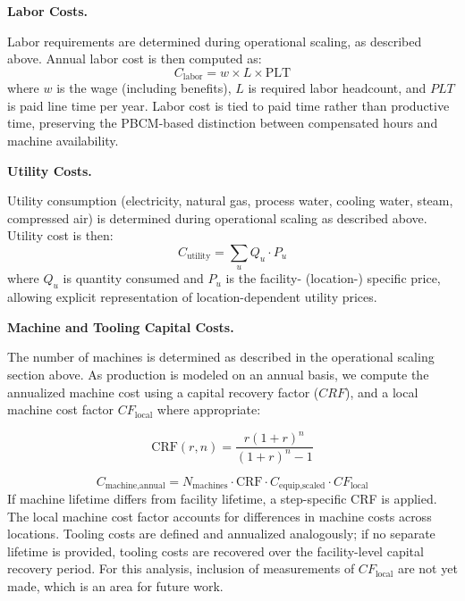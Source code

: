 \documentclass{article}
\renewcommand\_{\textunderscore\allowbreak}
\newcommand{\alteq}[1]{}
\newcommand{\alteqend}{}
\begin{document}
\medskip
\noindent\textbf{Labor Costs.}\quad

Labor requirements are determined during operational scaling, as described above. Annual labor cost is then computed as:
\begin{equation}
    C_{\text{labor}} = w \times L \times \text{PLT}
\end{equation}
where $w$ is the wage (including benefits), $L$ is required labor headcount, and $PLT$ is paid line time per year. Labor cost is tied to paid time rather than productive time, preserving the PBCM-based distinction between compensated hours and machine availability.

\medskip
\noindent\textbf{Utility Costs.}\quad

Utility consumption (electricity, natural gas, process water, cooling water, steam, compressed air) is determined during operational scaling as described above. Utility cost is then:
\begin{equation}
    C_{\text{utility}} = \sum_{u} Q_u \cdot P_u
\end{equation}
where $Q_u$ is quantity consumed and $P_u$ is the facility- (location-) specific price, allowing explicit representation of location-dependent utility prices.

\medskip
\noindent\textbf{Machine and Tooling Capital Costs.}\quad

The number of machines is determined as described in the operational scaling section above. As production is modeled on an annual basis, we compute the annualized machine cost using a capital recovery factor ($CRF$), and a local machine cost factor $CF_{\text{local}}$ where appropriate:
\alteq{Capital recovery factor CRF as a function of discount rate r and lifetime n equals r times the quantity one plus r raised to the n, divided by the quantity one plus r raised to the n minus one.}
\begin{equation}
    \text{CRF}(r, n) = \frac{r(1+r)^n}{(1+r)^n - 1}
    \label{eq:c-crf}
\end{equation}
\alteqend
\begin{equation}
    C_{\text{machine,annual}} = N_\text{{machines}} \cdot \text{CRF} \cdot C_{\text{equip,scaled}} \cdot CF_{\text{local}}
\end{equation}
If machine lifetime differs from facility lifetime, a step-specific CRF is applied. The local machine cost factor accounts for differences in machine costs across locations. Tooling costs are defined and annualized analogously; if no separate lifetime is provided, tooling costs are recovered over the facility-level capital recovery period. For this analysis, inclusion of measurements of $CF_{\text{local}}$ are not yet made, which is an area for future work.
\end{document}

